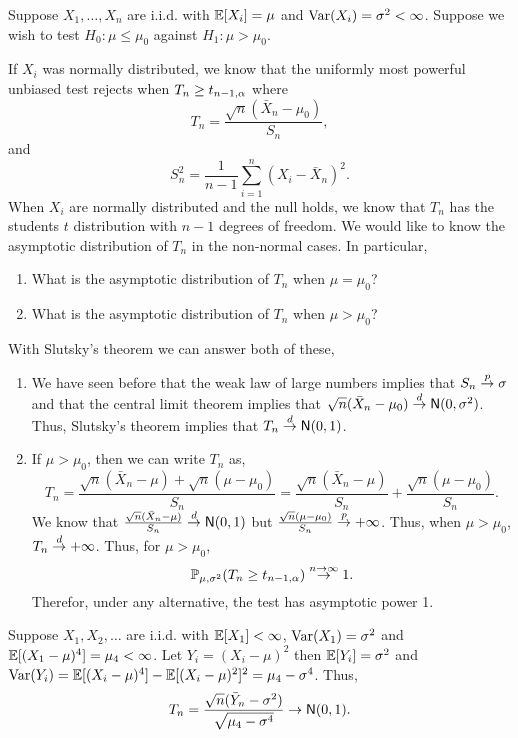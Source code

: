 \begin{example} Suppose $X_1,\ldots,X_n$ are i.i.d. with ${\mathbb{E}}[X_i]=\mu$ and $\operatorname{Var}(X_i) =\sigma^2 < \infty$. Suppose we wish to test $H_0 : \mu \le \mu_0$ against $H_1 : \mu > \mu_0$. 

    If $X_i$ was normally distributed, we know that the uniformly most powerful unbiased test rejects when $T_n \ge t_{n-1,{\alpha}}$ where 
    \[T_n = \frac{\sqrt{n}(\bar{X}_n-\mu_0)}{S_n}, \]
    and 
    \[ S_n^2 = \frac{1}{n-1}\sum_{i=1}^n (X_i-\bar{X}_n)^2.\]
    When $X_i$ are normally distributed and the null holds, we know that $T_n$ has the students $t$ distribution with $n-1$ degrees of freedom. We would like to know the asymptotic distribution of $T_n$ in the non-normal cases. In particular,
    \begin{enumerate}
        \item What is the asymptotic distribution of $T_n$ when $\mu = \mu_0$?
        \item What is the asymptotic distribution of $T_n$ when $\mu >\mu_0$?
    \end{enumerate}
    With Slutsky's theorem we can answer both of these,
    \begin{enumerate}
        \item We have seen before that the weak law of large numbers implies that $S_n \stackrel{p}{\to} \sigma$ and that the central limit theorem implies that $\sqrt{n}(\bar{X}_n-\mu_0)\stackrel{d}{\to} \mathsf{N}(0,\sigma^2)$. Thus, Slutsky's theorem implies that $T_n \stackrel{d}{\to} \mathsf{N}(0,1)$.
        \item If $\mu > \mu_0$, then we can write $T_n$ as,
        \[T_n = \frac{\sqrt{n}(\bar{X}_n-\mu)+\sqrt{n}(\mu-\mu_0)}{S_n} =\frac{\sqrt{n}(\bar{X}_n-\mu)}{S_n}+\frac{\sqrt{n}(\mu-\mu_0)}{S_n}. \] 
        We know that $\frac{\sqrt{n}(\bar{X}_n-\mu)}{S_n} \stackrel{d}{\to} \mathsf{N}(0,1)$ but $\frac{\sqrt{n}(\mu-\mu_0)}{S_n} \stackrel{p}{\to} +\infty$. Thus, when $\mu > \mu_0$, $T_n \stackrel{d}{\to} +\infty$. Thus, for $\mu > \mu_0$,
        \[{\mathbb{P}}_{\mu,\sigma^2}(T_n \ge t_{n-1,{\alpha}}) \stackrel{n \to \infty}{\to} 1. \]
        Therefor, under any alternative, the test has asymptotic power 1.
    \end{enumerate}
\end{example}
\begin{example}
    Suppose $X_1,X_2,\ldots$ are i.i.d. with ${\mathbb{E}}[X_1]<\infty$, $\operatorname{Var}(X_1)=\sigma^2$ and ${\mathbb{E}}[(X_1-\mu)^4] = \mu_4 < \infty$. Let $Y_i = (X_i-\mu)^2$ then ${\mathbb{E}}[Y_i] =\sigma^2$ and $\operatorname{Var}(Y_i) = {\mathbb{E}}[(X_i-\mu)^4] - {\mathbb{E}}[(X_i-\mu)^2]^2 = \mu_4-\sigma^4$. Thus,
    \[T_n = \frac{\sqrt{n}(\bar{Y}_n-\sigma^2)}{\sqrt{\mu_4-\sigma^4}} \to \mathsf{N}(0,1). \]
\end{example}
